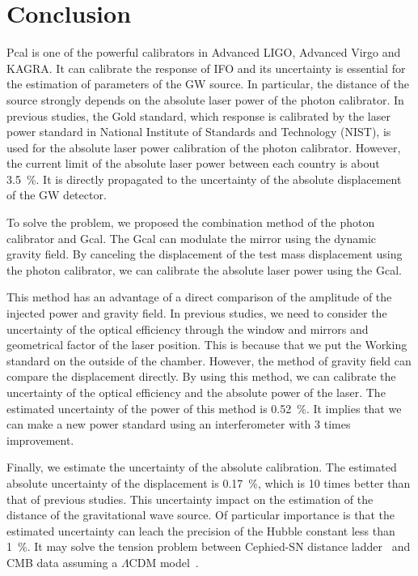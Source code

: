 \documentclass[%
 reprint,
superscriptaddress,
 amsmath,amssymb,
 aps,
]{revtex4-1}
\begin{document}
\section{Conclusion}
Pcal is one of the powerful calibrators in Advanced LIGO, Advanced Virgo and KAGRA. It can calibrate the response of IFO and its uncertainty is essential for the estimation of parameters of the GW source. In particular, the distance of the source strongly depends on the absolute laser power of the photon calibrator. In previous studies, the Gold standard, which response is calibrated by the laser power standard in National Institute of Standards and Technology (NIST), is used for the absolute laser power calibration of the photon calibrator. However, the current limit of the absolute laser power between each country is about 3.5~\%. It is directly propagated to the uncertainty of the absolute displacement of the GW detector.

To solve the problem, we proposed the combination method of the photon calibrator and Gcal. The Gcal can modulate the mirror using the dynamic gravity field. By canceling the displacement of the test mass displacement using the photon calibrator, we can calibrate the absolute laser power using the Gcal.

This method has an advantage of a direct comparison of the amplitude of the injected power and gravity field. In previous studies, we need to consider the uncertainty of the optical efficiency through the window and mirrors  and geometrical factor of the laser position. This is because that we put the Working standard on the outside of the chamber. However, the method of gravity field can compare the displacement directly. By using this method, we can calibrate the uncertainty of the optical efficiency and the absolute power of the laser.  The estimated uncertainty of the power of this method is 0.52~\%. It implies that we can make a new power standard using an interferometer with 3 times improvement.

Finally, we estimate the uncertainty of the absolute calibration. The estimated absolute uncertainty of the displacement is 0.17~\%, which is 10 times better than that of previous studies. This uncertainty impact on the estimation of the distance of the gravitational wave source. Of particular importance is that the estimated uncertainty can leach the precision of the Hubble constant less than 1~\%. It may solve the tension problem between Cephied-SN distance ladder~\cite{Riess_2016} and CMB data assuming a $\Lambda$CDM 
model~\cite{2016-planck}.
\end{document}
